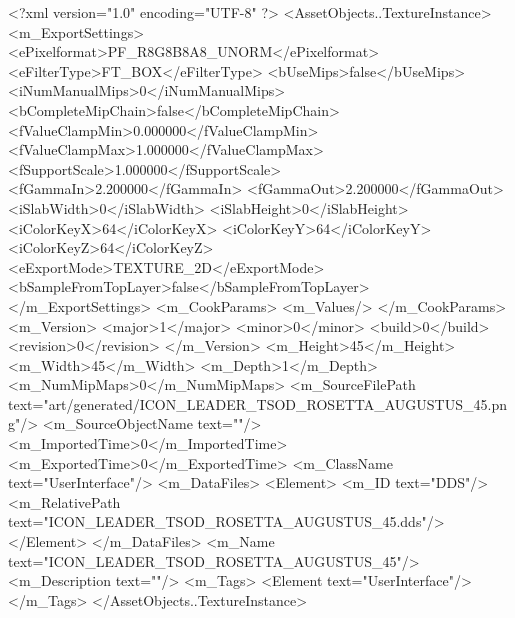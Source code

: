 <?xml version="1.0" encoding="UTF-8" ?>
<AssetObjects..TextureInstance>
	<m_ExportSettings>
		<ePixelformat>PF_R8G8B8A8_UNORM</ePixelformat>
		<eFilterType>FT_BOX</eFilterType>
		<bUseMips>false</bUseMips>
		<iNumManualMips>0</iNumManualMips>
		<bCompleteMipChain>false</bCompleteMipChain>
		<fValueClampMin>0.000000</fValueClampMin>
		<fValueClampMax>1.000000</fValueClampMax>
		<fSupportScale>1.000000</fSupportScale>
		<fGammaIn>2.200000</fGammaIn>
		<fGammaOut>2.200000</fGammaOut>
		<iSlabWidth>0</iSlabWidth>
		<iSlabHeight>0</iSlabHeight>
		<iColorKeyX>64</iColorKeyX>
		<iColorKeyY>64</iColorKeyY>
		<iColorKeyZ>64</iColorKeyZ>
		<eExportMode>TEXTURE_2D</eExportMode>
		<bSampleFromTopLayer>false</bSampleFromTopLayer>
	</m_ExportSettings>
	<m_CookParams>
		<m_Values/>
	</m_CookParams>
	<m_Version>
		<major>1</major>
		<minor>0</minor>
		<build>0</build>
		<revision>0</revision>
	</m_Version>
	<m_Height>45</m_Height>
	<m_Width>45</m_Width>
	<m_Depth>1</m_Depth>
	<m_NumMipMaps>0</m_NumMipMaps>
	<m_SourceFilePath text="art/generated/ICON_LEADER_TSOD_ROSETTA_AUGUSTUS_45.png"/>
	<m_SourceObjectName text=""/>
	<m_ImportedTime>0</m_ImportedTime>
	<m_ExportedTime>0</m_ExportedTime>
	<m_ClassName text="UserInterface"/>
	<m_DataFiles>
		<Element>
			<m_ID text="DDS"/>
			<m_RelativePath text="ICON_LEADER_TSOD_ROSETTA_AUGUSTUS_45.dds"/>
		</Element>
	</m_DataFiles>
	<m_Name text="ICON_LEADER_TSOD_ROSETTA_AUGUSTUS_45"/>
	<m_Description text=""/>
	<m_Tags>
		<Element text="UserInterface"/>
	</m_Tags>
</AssetObjects..TextureInstance>
